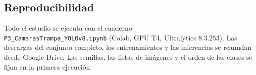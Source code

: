 \documentclass{article}
\begin{document}
\subsection{Reproducibilidad}
Todo el estudio se ejecuta con el cuaderno\\ \texttt{P3\_CamarasTrampa\_YOLOv8.ipynb} (Colab, GPU T4, Ultralytics 8.3.253). Las descargas del conjunto completo, los entrenamientos y las inferencias se reanudan desde Google Drive. Las semillas, las listas de imágenes y el orden de las clases se fijan en la primera ejecución.
\end{document}
